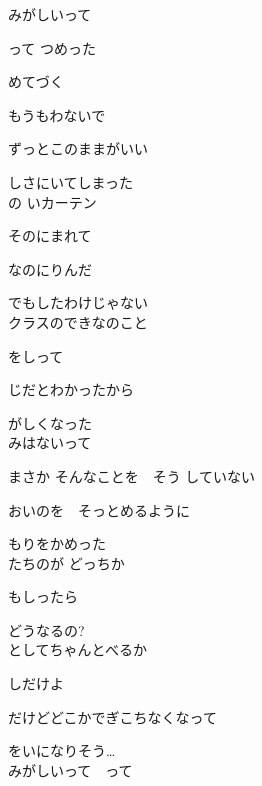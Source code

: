 みがしいって

って つめった

 めてづく

もうもわないで

ずっとこのままがいい

しさにいてしまった
\\

の いカーテン

そのにまれて

なのにりんだ

でもしたわけじゃない
\\

クラスのできなのこと

をしって

じだとわかったから

がしくなった
\\

みはないって

まさか そんなことを　そう していない

おいのを　そっとめるように

もりをかめった
\\

たちのが どっちか

もしったら

どうなるの?
\\

としてちゃんとべるか

しだけよ

だけどどこかでぎこちなくなって

をいになりそう…
\\

みがしいって　って

